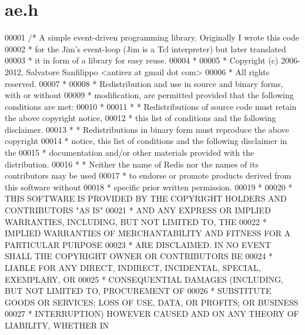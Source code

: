 \hypertarget{ae_8h_source}{}\section{ae.\+h}
\label{ae_8h_source}

\begin{DoxyCode}
00001 \textcolor{comment}{/* A simple event-driven programming library. Originally I wrote this code}
00002 \textcolor{comment}{ * for the Jim's event-loop (Jim is a Tcl interpreter) but later translated}
00003 \textcolor{comment}{ * it in form of a library for easy reuse.}
00004 \textcolor{comment}{ *}
00005 \textcolor{comment}{ * Copyright (c) 2006-2012, Salvatore Sanfilippo <antirez at gmail dot com>}
00006 \textcolor{comment}{ * All rights reserved.}
00007 \textcolor{comment}{ *}
00008 \textcolor{comment}{ * Redistribution and use in source and binary forms, with or without}
00009 \textcolor{comment}{ * modification, are permitted provided that the following conditions are met:}
00010 \textcolor{comment}{ *}
00011 \textcolor{comment}{ *   * Redistributions of source code must retain the above copyright notice,}
00012 \textcolor{comment}{ *     this list of conditions and the following disclaimer.}
00013 \textcolor{comment}{ *   * Redistributions in binary form must reproduce the above copyright}
00014 \textcolor{comment}{ *     notice, this list of conditions and the following disclaimer in the}
00015 \textcolor{comment}{ *     documentation and/or other materials provided with the distribution.}
00016 \textcolor{comment}{ *   * Neither the name of Redis nor the names of its contributors may be used}
00017 \textcolor{comment}{ *     to endorse or promote products derived from this software without}
00018 \textcolor{comment}{ *     specific prior written permission.}
00019 \textcolor{comment}{ *}
00020 \textcolor{comment}{ * THIS SOFTWARE IS PROVIDED BY THE COPYRIGHT HOLDERS AND CONTRIBUTORS "AS IS"}
00021 \textcolor{comment}{ * AND ANY EXPRESS OR IMPLIED WARRANTIES, INCLUDING, BUT NOT LIMITED TO, THE}
00022 \textcolor{comment}{ * IMPLIED WARRANTIES OF MERCHANTABILITY AND FITNESS FOR A PARTICULAR PURPOSE}
00023 \textcolor{comment}{ * ARE DISCLAIMED. IN NO EVENT SHALL THE COPYRIGHT OWNER OR CONTRIBUTORS BE}
00024 \textcolor{comment}{ * LIABLE FOR ANY DIRECT, INDIRECT, INCIDENTAL, SPECIAL, EXEMPLARY, OR}
00025 \textcolor{comment}{ * CONSEQUENTIAL DAMAGES (INCLUDING, BUT NOT LIMITED TO, PROCUREMENT OF}
00026 \textcolor{comment}{ * SUBSTITUTE GOODS OR SERVICES; LOSS OF USE, DATA, OR PROFITS; OR BUSINESS}
00027 \textcolor{comment}{ * INTERRUPTION) HOWEVER CAUSED AND ON ANY THEORY OF LIABILITY, WHETHER IN}

\end{DoxyCode}
